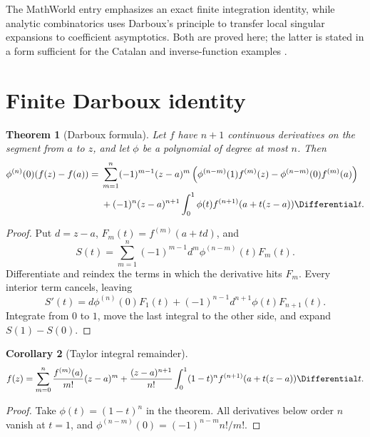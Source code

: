 \documentclass[11pt,a4paper,oneside,openany]{book}
\newtheorem{theorem}{Theorem}[chapter]
\newtheorem{corollary}[theorem]{Corollary}
\theoremstyle{definition}
\theoremstyle{remark}
\begin{document}
The MathWorld entry emphasizes an exact finite integration identity, while
analytic combinatorics uses Darboux's principle to transfer local singular
expansions to coefficient asymptotics.  Both are proved here; the latter is
stated in a form sufficient for the Catalan and inverse-function examples
\cite{FlajoletSedgewick2009}.

\section{Finite Darboux identity}

\begin{theorem}[Darboux formula]
\label{thm:merged-darboux-finite}
Let $f$ have $n+1$ continuous derivatives on the segment from $a$ to $z$, and
let $\phi$ be a polynomial of degree at most $n$.  Then
\begin{align}
 \phi^{(n)}(0)(f(z)-f(a))
={}&\sum_{m=1}^{n}(-1)^{m-1}(z-a)^m
 \left(\phi^{(n-m)}(1)f^{(m)}(z)
      -\phi^{(n-m)}(0)f^{(m)}(a)\right)                             \notag\\
 &+(-1)^n(z-a)^{n+1}\int_0^1\phi(t)
 f^{(n+1)}(a+t(z-a))\Differential t.                                         \label{eq:merged-darboux-finite}
\end{align}
\end{theorem}

\begin{proof}
Put $d=z-a$, $F_m(t)=f^{(m)}(a+td)$, and
\[
 S(t)=\sum_{m=1}^{n}(-1)^{m-1}d^m\phi^{(n-m)}(t)F_m(t).
\]
Differentiate and reindex the terms in which the derivative hits $F_m$.
Every interior term cancels, leaving
\[
 S'(t)=d\phi^{(n)}(0)F_1(t)
       +(-1)^{n-1}d^{n+1}\phi(t)F_{n+1}(t).
\]
Integrate from $0$ to $1$, move the last integral to the other side, and
expand $S(1)-S(0)$.
\end{proof}

\begin{corollary}[Taylor integral remainder]
\begin{equation}
 f(z)=\sum_{m=0}^{n}\frac{f^{(m)}(a)}{m!}(z-a)^m
 +\frac{(z-a)^{n+1}}{n!}\int_0^1(1-t)^n
 f^{(n+1)}(a+t(z-a))\Differential t.                                        \label{eq:merged-taylor-remainder}
\end{equation}
\end{corollary}

\begin{proof}
Take $\phi(t)=(1-t)^n$ in the theorem.  All derivatives below order $n$
vanish at $t=1$, and
$\phi^{(n-m)}(0)=(-1)^{n-m}n!/m!$.
\end{proof}
\end{document}
